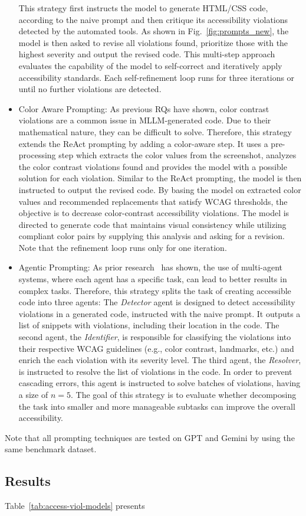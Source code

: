 \begin{itemize}
    This strategy first instructs the model to generate HTML/CSS code, 
    according to the naive prompt and then critique its accessibility
    violations detected by the automated tools. As shown in 
    Fig.~\ref{fig:prompts_new}, the model is then asked to revise
    all violations found, prioritize those with the highest 
    severity and output the revised code.
    This multi-step approach evaluates the capability of the model to 
    self-correct and iteratively apply accessibility standards. 
    Each self-refinement loop runs for three iterations or until 
    no further violations are detected.
    \item Color Aware Prompting: 
    As previous RQs have shown, color contrast violations are a common 
    issue in MLLM-generated code. Due to their mathematical nature, they
    can be difficult to solve. Therefore, this strategy extends the ReAct 
    prompting by adding a color-aware step. It uses a pre-processing 
    step which extracts the color values from the screenshot, analyzes 
    the color contrast violations found and provides the model with a 
    possible solution for each violation. Similar to the ReAct prompting,
    the model is then instructed to output the revised code. 
    By basing the model on extracted color values and recommended 
    replacements that satisfy WCAG thresholds, the objective is to 
    decrease color-contrast accessibility violations. The model is 
    directed to generate code that maintains visual consistency while 
    utilizing compliant color pairs by supplying this analysis and 
    asking for a revision.
    Note that the refinement loop runs only for one iteration.
    \item Agentic Prompting: 
    As prior research~\cite{wu2023autogen} has shown, the use of multi-agent 
    systems, where each agent has a specific task, can lead to better
    results in complex tasks. Therefore, this strategy splits the 
    task of creating accessible code into three agents: The 
    \textit{Detector} agent is designed to detect accessibility violations 
    in a generated code, instructed with the naive prompt. It outputs a list
    of snippets with violations, including their location in the code. The 
    second agent, the \textit{Identifier}, is responsible for classifying 
    the violations into their respective WCAG guidelines (e.g., 
    color contrast, landmarks, etc.) and enrich the each violation with 
    its severity level. The third agent, the \textit{Resolver}, is 
    instructed to resolve the list of violations in the code. In order to 
    prevent cascading errors, this agent is instructed to solve batches 
    of violations, having a size of \(n = 5\). The goal of this strategy 
    is to evaluate whether decomposing the task into smaller and more 
    manageable subtasks can improve the overall accessibility.
\end{itemize}

Note that all prompting techniques are tested on GPT and Gemini by using the 
same benchmark dataset.


\subsection{Results}
Table~\ref{tab:access-viol-models} presents

\begingroup
    
\endgroup